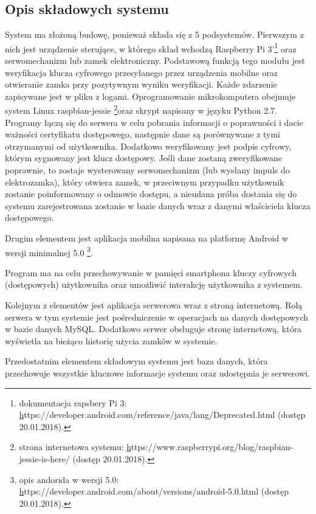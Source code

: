 \subsection{Opis składowych systemu}
System ma złożoną budowę, ponieważ składa się z 5 podsystemów. Pierwszym z nich jest urządzenie sterujące, w którego skład wchodzą Raspberry Pi 3'\footnote{dokumentacja rapsbery Pi 3: \hyperref[dokumentacja_rapsbery_PI] https://developer.android.com/reference/java/lang/Deprecated.html (dostęp 20.01.2018).} oraz serwomechanizm lub zamek elektroniczny. Podstawową funkcją tego modułu jest weryfikacja klucza cyfrowego przesyłanego przez urządzenia mobilne oraz otwieranie zamka przy pozytywnym wyniku weryfikacji. Każde zdarzenie zapisywane jest w pliku z logami. Oprogramowanie mikrokomputera obejmuje system Linux raspbian-jessie \footnote{strona internetowa systemu: \hyperref[sec:trona internetowa rapsberyy jessie] https://www.raspberrypi.org/blog/raspbian-jessie-is-here/ (dostęp 20.01.2018).}oraz skrypt napisany w języku Python 2.7. Programy łączą się do serwera w celu pobrania informacji o poprawności i dacie ważności certyfikatu dostępowego, następnie dane są porównywane z tymi otrzymanymi od użytkownika. Dodatkowo weryfikowany jest podpis cyfrowy, którym sygnowany jest klucz dostępowy. Jeśli dane zostaną zweryfikowane poprawnie, to zostaje wysterowany serwomechanizm (lub wysłany impuls do elektrozamka), który otwiera zamek, w przeciwnym przypadku użytkownik zostanie poinformowany o odmowie dostępu, a nieudana próba dostania się do systemu zarejestrowana zostanie w bazie danych wraz z danymi właściciela klucza dostępowego.

Drugim elementem jest aplikacja mobilna napisana na platformę Android w wersji minimalnej 5.0
 \footnote{opis andorida w wersji 5.0: \hyperref[sec:trona z opisem adnroid 5.0] https://developer.android.com/about/versions/android-5.0.html (dostęp 20.01.2018).}.


 Program ma na celu przechowywanie w pamięci smartphona kluczy cyfrowych (dostępowych) użytkownika oraz umożliwić interakcję użytkownika z systemem.

Kolejnym z elementów jest aplikacja serwerowa wraz z stroną internetową. Rolą serwera w tym systemie jest pośredniczenie w operacjach na danych dostępowych w bazie danych MySQL. Dodatkowo serwer obsługuje stronę internetową, która wyświetla na bieżąco historię użycia zamków w systemie.

Przedostatnim elementem składowym systemu jest baza danych, która przechowuje wszystkie kluczowe informacje systemu oraz udostępnia je serwerowi.

